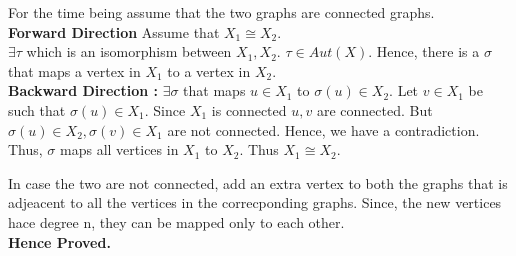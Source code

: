 For the time being assume that the two graphs are connected graphs.\\
\textbf{Forward Direction} Assume that $X_1 \cong X_2$.\\
	$\exists \tau$ which is an isomorphism between $X_1,X_2$. $\tau \in Aut(X)$. Hence, there is a $\sigma$ that maps a vertex in $X_1$ to a vertex in $X_2$.\\
\textbf{Backward Direction :} $\exists \sigma$ that maps $u \in X_1$ to $\sigma(u) \in X_2$. Let $v \in X_1$ be such that $\sigma(u) \in X_1$. Since $X_1$ is connected $u,v$ are connected. But $\sigma(u) \in X_2, \sigma(v) \in X_1$ are not connected. Hence, we have a contradiction. Thus, $\sigma$ maps all vertices in $X_1$ to $X_2$. Thus $X_1 \cong X_2$.

In case the two are not connected, add an extra vertex to both the graphs that is adjeacent to all the vertices in the correcponding graphs. Since, the new vertices hace degree n, they can be mapped only to each other.\\
\textbf{Hence Proved.}


